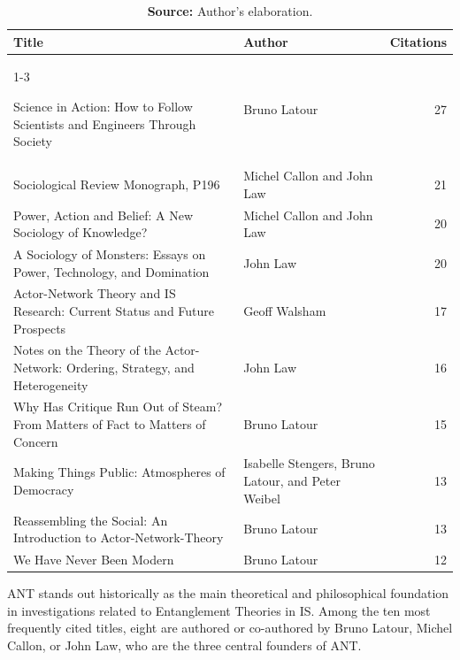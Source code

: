  
\begin{table}[ht!]
\centering
\scriptsize
\caption{Most Frequently Cited External References in the Analyzed Documents}
\begin{tabular}{p{9.3cm}p{3.2cm}r}
\toprule
\textbf{Title} & \textbf{Author} & \textbf{Citations} \\
\cmidrule[0.4pt]{1-3}

Science in Action: How to Follow Scientists and Engineers Through Society & Bruno Latour & 27 \\

Sociological Review Monograph, P196 & Michel Callon and John Law & 21 \\

Power, Action and Belief: A New Sociology of Knowledge? & Michel Callon and John Law & 20 \\

A Sociology of Monsters: Essays on Power, Technology, and Domination & John Law & 20 \\

Actor-Network Theory and IS Research: Current Status and Future Prospects & Geoff Walsham & 17 \\

Notes on the Theory of the Actor-Network: Ordering, Strategy, and Heterogeneity & John Law & 16 \\

Why Has Critique Run Out of Steam? From Matters of Fact to Matters of Concern & Bruno Latour & 15 \\

Making Things Public: Atmospheres of Democracy & Isabelle Stengers, Bruno Latour, and Peter Weibel & 13 \\

Reassembling the Social: An Introduction to Actor-Network-Theory & Bruno Latour & 13 \\

We Have Never Been Modern & Bruno Latour & 12 \\

\bottomrule
\end{tabular}
\label{tab:principais_referencias_citadas_local}
\caption*{\textbf{Source:} Author’s elaboration.}
\end{table}


ANT stands out historically as the main theoretical and philosophical foundation in investigations related to Entanglement Theories in IS. Among the ten most frequently cited titles, eight are authored or co-authored by Bruno Latour, Michel Callon, or John Law, who are the three central founders of ANT.

